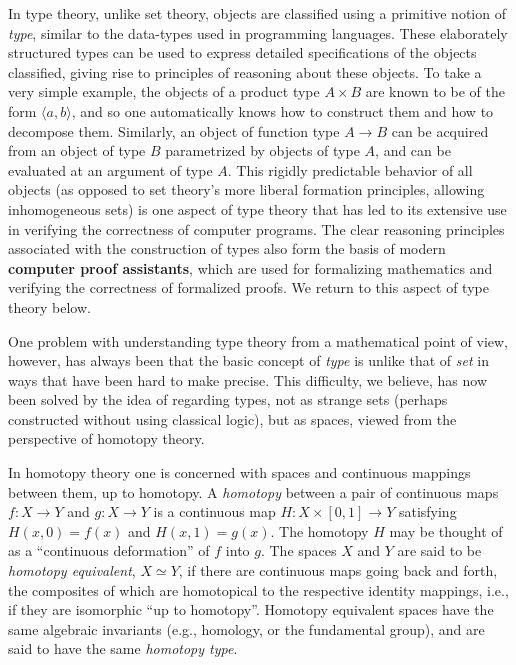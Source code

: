 {%

In type theory, unlike set theory, objects are classified using a primitive notion of \emph{type}, similar to the data-types used in programming languages.  These elaborately structured types can be used to express detailed specifications of the objects classified, giving rise to principles of reasoning about these objects.  To take a very simple example, the objects of a product type $A\times B$ are known to be of the form $\langle a, b\rangle$, and so one automatically knows how to construct them and how to decompose them. Similarly, an object of function type $A\to B$ can be acquired from an object of type $B$ parametrized by objects of type $A$, and can be evaluated at an argument of type $A$.  This rigidly predictable behavior of all objects (as opposed to set theory's more liberal formation principles, allowing inhomogeneous sets) is one aspect of type theory that has led to its extensive use in verifying the correctness of computer programs.  The clear reasoning principles associated with the construction of types also form the basis of modern {\bf computer proof assistants}, which are used for formalizing mathematics and verifying the correctness of formalized proofs.  We return to this aspect of type theory below.  



One problem with understanding type theory from a mathematical point of view, however, has always been that the basic concept of \emph{type} is unlike that of \emph{set} in ways that have been hard to make precise. This difficulty, we believe, has now been solved by the idea of regarding types, not as strange sets (perhaps constructed without using classical logic), but as spaces, viewed from the perspective of homotopy theory.

In homotopy theory one is concerned with spaces and continuous mappings between them, 
up to homotopy.  A \emph{homotopy} between a pair of continuous maps $f \colon X \to Y$
and  $g \colon X\to Y$ is 
a continuous map $H \colon X \times [0, 1] \to Y$ satisfying
$H(x, 0) = f (x)$  and $H(x, 1) = g(x)$. The homotopy $H$ may be thought of as a ``continuous deformation'' of $f$ into $g$. The spaces $X$ and $Y$ are said to be \emph{homotopy equivalent}, $X\simeq Y$, if there are continuous maps going back and forth, the composites of which are homotopical to the respective identity mappings, i.e., if they are isomorphic ``up to homotopy''.  Homotopy equivalent spaces have the same algebraic invariants (e.g., homology, or the fundamental group), and are said to have the same \emph{homotopy type}.

}
